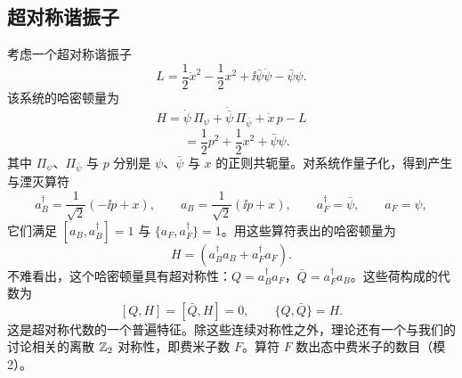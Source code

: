 \subsection{超对称谐振子}

考虑一个超对称谐振子
\[
L = \frac{1}{2}\dot x^2 - \frac{1}{2}x^2 + \ii\bar\psi\dot\psi - \bar\psi\psi .
\tag{1.1}
\]
该系统的哈密顿量为
\[
H = \dot\psi\,\Pi_\psi + \dot{\bar\psi}\,\Pi_{\bar\psi} + \dot x\,p - L
\tag{1.2}
\]
\[
\phantom{H} = \frac{1}{2}p^2 + \frac{1}{2}x^2 + \bar\psi\psi .
\tag{1.3}
\]
其中 $\Pi_\psi$、$\Pi_{\bar\psi}$ 与 $p$ 分别是 $\psi$、$\bar\psi$ 与 $x$ 的正则共轭量。对系统作量子化，得到产生与湮灭算符
\[
a_B^\dagger = \frac{1}{\sqrt2}(-\ii p + x),\qquad
a_B = \frac{1}{\sqrt2}(\ii p + x),\qquad
a_F^\dagger = \bar\psi,\qquad
a_F = \psi ,
\tag{1.4}
\]
它们满足 $[a_B, a_B^\dagger] = 1$ 与 $\{a_F, a_F^\dagger\} = 1$。用这些算符表出的哈密顿量为
\[
H = (a_B^\dagger a_B + a_F^\dagger a_F) .
\tag{1.5}
\]
不难看出，这个哈密顿量具有超对称性：$Q = a_B^\dagger a_F$，$\bar Q = a_F^\dagger a_B$。这些荷构成的代数为
\[
[Q, H] = [\bar Q, H] = 0 ,\qquad \{Q, \bar Q\} = H .
\tag{1.6}
\]
这是超对称代数的一个普遍特征。除这些连续对称性之外，理论还有一个与我们的讨论相关的离散 $\mathbb{Z}_2$ 对称性，即费米子数 $F$。算符 $F$ 数出态中费米子的数目（模 2）。

